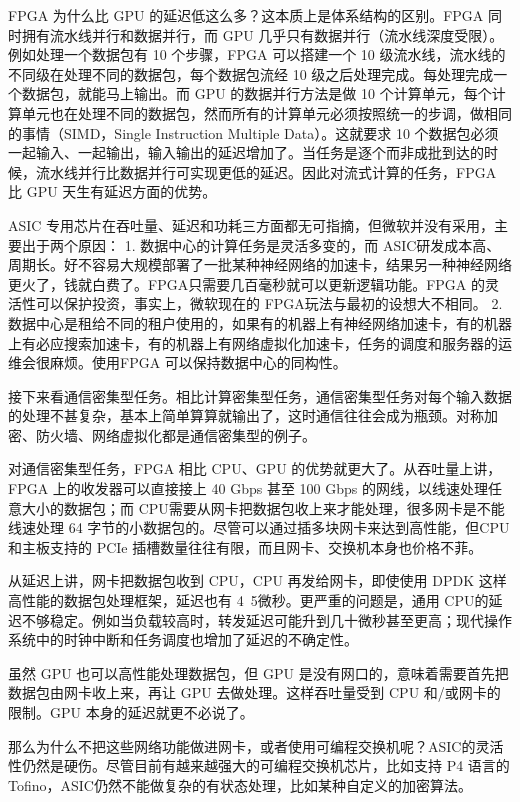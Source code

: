 FPGA 为什么比 GPU 的延迟低这么多？这本质上是体系结构的区别。FPGA 同时拥有流水线并行和数据并行，而 GPU 几乎只有数据并行（流水线深度受限）。例如处理一个数据包有 10 个步骤，FPGA 可以搭建一个 10 级流水线，流水线的不同级在处理不同的数据包，每个数据包流经 10 级之后处理完成。每处理完成一个数据包，就能马上输出。而 GPU 的数据并行方法是做 10 个计算单元，每个计算单元也在处理不同的数据包，然而所有的计算单元必须按照统一的步调，做相同的事情（SIMD，Single Instruction Multiple Data）。这就要求 10 个数据包必须一起输入、一起输出，输入输出的延迟增加了。当任务是逐个而非成批到达的时候，流水线并行比数据并行可实现更低的延迟。因此对流式计算的任务，FPGA 比 GPU 天生有延迟方面的优势。

ASIC 专用芯片在吞吐量、延迟和功耗三方面都无可指摘，但微软并没有采用，主要出于两个原因：
1.	数据中心的计算任务是灵活多变的，而 ASIC研发成本高、周期长。好不容易大规模部署了一批某种神经网络的加速卡，结果另一种神经网络更火了，钱就白费了。FPGA只需要几百毫秒就可以更新逻辑功能。FPGA 的灵活性可以保护投资，事实上，微软现在的 FPGA玩法与最初的设想大不相同。
2.	数据中心是租给不同的租户使用的，如果有的机器上有神经网络加速卡，有的机器上有必应搜索加速卡，有的机器上有网络虚拟化加速卡，任务的调度和服务器的运维会很麻烦。使用FPGA 可以保持数据中心的同构性。

接下来看通信密集型任务。相比计算密集型任务，通信密集型任务对每个输入数据的处理不甚复杂，基本上简单算算就输出了，这时通信往往会成为瓶颈。对称加密、防火墙、网络虚拟化都是通信密集型的例子。

对通信密集型任务，FPGA 相比 CPU、GPU 的优势就更大了。从吞吐量上讲，FPGA 上的收发器可以直接接上 40 Gbps 甚至 100 Gbps 的网线，以线速处理任意大小的数据包；而 CPU需要从网卡把数据包收上来才能处理，很多网卡是不能线速处理 64 字节的小数据包的。尽管可以通过插多块网卡来达到高性能，但CPU 和主板支持的 PCIe 插槽数量往往有限，而且网卡、交换机本身也价格不菲。

从延迟上讲，网卡把数据包收到 CPU，CPU 再发给网卡，即使使用 DPDK 这样高性能的数据包处理框架，延迟也有 4~5微秒。更严重的问题是，通用 CPU的延迟不够稳定。例如当负载较高时，转发延迟可能升到几十微秒甚至更高；现代操作系统中的时钟中断和任务调度也增加了延迟的不确定性。

虽然 GPU 也可以高性能处理数据包，但 GPU 是没有网口的，意味着需要首先把数据包由网卡收上来，再让 GPU 去做处理。这样吞吐量受到 CPU 和/或网卡的限制。GPU 本身的延迟就更不必说了。

那么为什么不把这些网络功能做进网卡，或者使用可编程交换机呢？ASIC的灵活性仍然是硬伤。尽管目前有越来越强大的可编程交换机芯片，比如支持 P4 语言的 Tofino，ASIC仍然不能做复杂的有状态处理，比如某种自定义的加密算法。

